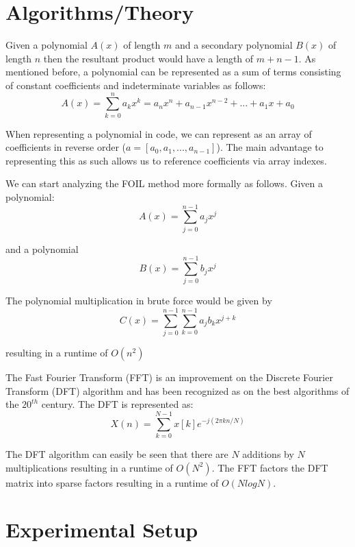 \documentclass[12pt]{article}
\begin{document}
        \section{Algorithms/Theory}
        \indent\par{Given a polynomial $A(x)$ of length $m$ and a secondary polynomial $B(x)$ of length $n$ then the resultant product would have a length of $m+n-1$. As mentioned before, a polynomial can be represented as a sum of terms consisting of constant coefficients and indeterminate variables as follows: }
        $$A(x) = \sum_{k=0}^{n}a_kx^k = a_nx^n + a_{n-1}x^{n-2} + ... + a_1x + a_0$$
        \indent\par{When representing a polynomial in code, we can represent as an array of coefficients in reverse order ($a = [a_0,a_1,...,a_{n-1}]$). The main advantage to representing this as such allows us to reference coefficients via array indexes. }
        \indent\par{We can start analyzing the FOIL method more formally as follows. Given a polynomial:}
        $$ A(x)=\sum_{j=0}^{n-1}a_jx^j $$
        \par{and a polynomial}
        $$ B(x) =\sum_{j=0}^{n-1} b_jx^j $$
        \par{The polynomial multiplication in brute force would be given by }
        $$ C(x)=\sum_{j=0}^{n-1}\sum_{k=0}^{n-1}a_jb_kx^{j+k} $$
        \par{resulting in a runtime of $O(n^2)$}
        \indent\par{The Fast Fourier Transform (FFT) is an improvement on the Discrete Fourier Transform (DFT) algorithm and has been recognized as on the best algorithms of the $20^{th}$ century\cite{dongarra2000guest}. The DFT is represented as: }
        $$X(n)=\sum_{k=0}^{N-1}x[k]e^{-j(2\pi kn/N)}$$
        \indent\par{The DFT algorithm can easily be seen that there are $N$ additions by $N$ multiplications resulting in a runtime of $O(N^2)$. The FFT factors the DFT matrix into sparse factors resulting in a runtime of $O(N log N)$.}
        \section{Experimental Setup}
\end{document}
